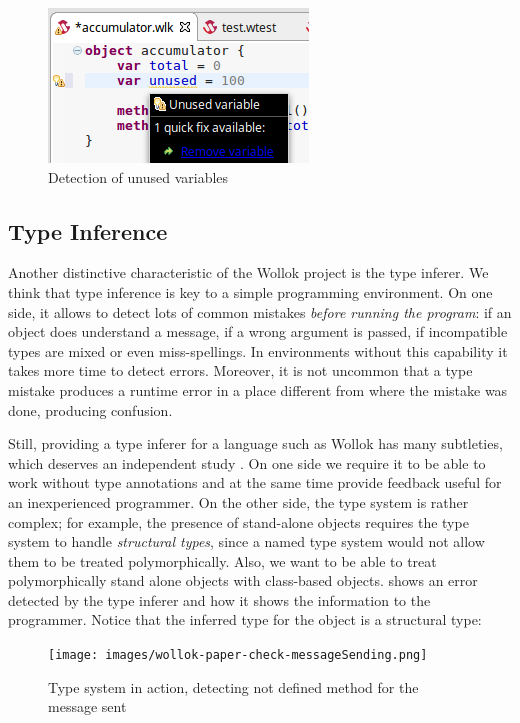\begin{figure}[ht]
    \centering
	\includegraphics[scale=0.5]{images/wollok-paper-check-unusedVariable.png}
    \caption{Detection of unused variables}
    \label{fig:check-unusedVariable.png}
\end{figure}


\subsection{Type Inference}
Another distinctive characteristic of the Wollok project is the type inferer.
We think that type inference is key to a simple programming environment.
On one side, it allows to detect lots of common mistakes \emph{before running the program}:
if an object does understand a message, if a wrong argument is passed, if incompatible types are mixed or even miss-spellings.
In environments without this capability it takes more time to detect errors.
Moreover, it is not uncommon that a type mistake produces a runtime error in a place different from where the mistake was done, producing confusion.

Still, providing a type inferer for a language such as Wollok has many subtleties, which deserves an independent study \cite{passerini_nicolas_extensible_2014}.
On one side we require it to be able to work without type annotations and at the same time provide feedback useful for an inexperienced programmer.
On the other side, the type system is rather complex;
for example, the presence of stand-alone objects requires the type system to handle \emph{structural types}, since a named type system would not allow them to be treated polymorphically.
Also, we want to be able to treat polymorphically stand alone objects with class-based objects.
 shows an error detected by the type inferer and how it shows the information to the programmer.
Notice that the inferred type for the object  is a structural type: 

\begin{figure}[ht]
    \centering
	\texttt{[image: images/wollok-paper-check-messageSending.png]}
    \caption{Type system in action, detecting not defined method for the message sent}
    \label{fig:check-messageSending.png}
\end{figure}


